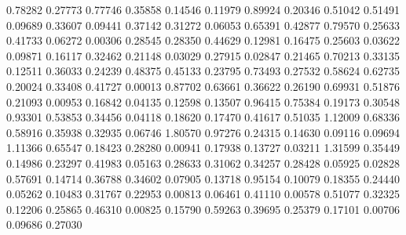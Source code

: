   0.78282 0.27773
  0.77746 0.35858
  0.14546 0.11979
  0.89924 0.20346
  0.51042 0.51491
  0.09689 0.33607
  0.09441 0.37142
  0.31272 0.06053
  0.65391 0.42877
  0.79570 0.25633
  0.41733 0.06272
  0.00306 0.28545
  0.28350 0.44629
  0.12981 0.16475
  0.25603 0.03622
  0.09871 0.16117
  0.32462 0.21148
  0.03029 0.27915
  0.02847 0.21465
  0.70213 0.33135
  0.12511 0.36033
  0.24239 0.48375
  0.45133 0.23795
  0.73493 0.27532
  0.58624 0.62735
  0.20024 0.33408
  0.41727 0.00013
  0.87702 0.63661
  0.36622 0.26190
  0.69931 0.51876
  0.21093 0.00953
  0.16842 0.04135
  0.12598 0.13507
  0.96415 0.75384
  0.19173 0.30548
  0.93301 0.53853
  0.34456 0.04118
  0.18620 0.17470
  0.41617 0.51035
  1.12009 0.68336
  0.58916 0.35938
  0.32935 0.06746
  1.80570 0.97276
  0.24315 0.14630
  0.09116 0.09694
  1.11366 0.65547
  0.18423 0.28280
  0.00941 0.17938
  0.13727 0.03211
  1.31599 0.35449
  0.14986 0.23297
  0.41983 0.05163
  0.28633 0.31062
  0.34257 0.28428
  0.05925 0.02828
  0.57691 0.14714
  0.36788 0.34602
  0.07905 0.13718
  0.95154 0.10079
  0.18355 0.24440
  0.05262 0.10483
  0.31767 0.22953
  0.00813 0.06461
  0.41110 0.00578
  0.51077 0.32325
  0.12206 0.25865
  0.46310 0.00825
  0.15790 0.59263
  0.39695 0.25379
  0.17101 0.00706
  0.09686 0.27030
